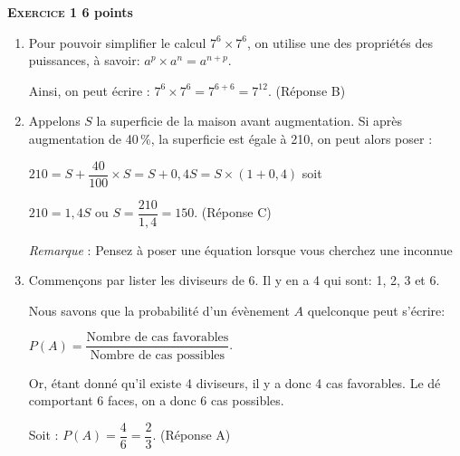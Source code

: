 \textbf{\textsc{Exercice 1} \hfill 6 points}

\medskip

\begin{enumerate}
\item Pour pouvoir simplifier le calcul \:$7^6 \times 7^6$, on utilise une des propriétés des puissances, à savoir: $a^p \times  a^n = a^{n+p}$.

Ainsi, on peut écrire : $7^6 \times 7^6 = 7^{6+6} = 7^{12}$. (Réponse B)
\item Appelons $S$ la superficie de la maison avant augmentation. Si après augmentation de 40\,\%, la superficie est égale à 210, on peut alors poser :

$210 = S + \dfrac{40}{100} \times  S = S + 0,4S  = S \times  (1 + 0,4)$ soit 

$210 = 1,4S$ ou $S = \dfrac{210}{1,4} = 150$. (Réponse C)

\emph{Remarque} : Pensez à poser une équation lorsque vous cherchez une inconnue
\item Commençons par lister les diviseurs de 6. Il y en a 4 qui sont: 1, 2, 3 et 6.

Nous savons que la probabilité d'un évènement $A$ quelconque peut s'écrire:

$P(A) = \dfrac{\text{Nombre de cas favorables}}{\text{Nombre de cas possibles}}$.

Or, étant donné qu'il existe 4 diviseurs, il y a donc 4 cas favorables. Le dé comportant 6 faces, on a donc 6 cas possibles.

Soit : $P(A) = \dfrac{4}{6} = \dfrac{2}{3}$.  (Réponse A)
\end{enumerate}

\vspace{0,25cm}

